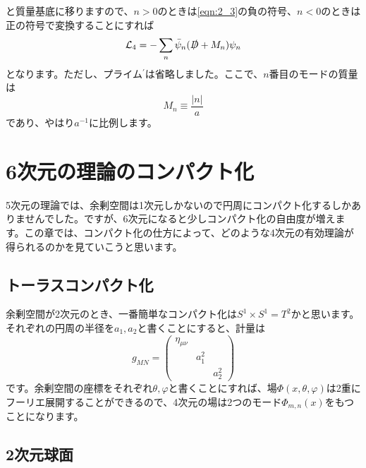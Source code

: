 \documentclass[unicode,a4paper,11pt]{ltjsarticle}
\begin{document}
と質量基底に移りますので、$n>0$のときは\eqref{eqn:2_3}の負の符号、$n<0$のときは正の符号で変換することにすれば
\begin{equation}
   \mathcal{L}_{4}
   =
   -
   \sum_{n}\bar{\psi}_{n}(\slashed{D}+M_{n})\psi_{n}
\end{equation}
となります。ただし、プライム$^{\prime}$は省略しました。ここで、$n$番目のモードの質量は
\begin{equation}
   M_{n}
   \equiv
   \frac{|n|}{a}
\end{equation}
であり、やはり$a^{-1}$に比例します。


\section{6次元の理論のコンパクト化}

5次元の理論では、余剰空間は1次元しかないので円周にコンパクト化するしかありませんでした。ですが、6次元になると少しコンパクト化の自由度が増えます。この章では、コンパクト化の仕方によって、どのような4次元の有効理論が得られるのかを見ていこうと思います。

\subsection{トーラスコンパクト化}

余剰空間が2次元のとき、一番簡単なコンパクト化は$S^{1}\times S^{1}=T^{2}$かと思います。それぞれの円周の半径を$a_{1},a_{2}$と書くことにすると、計量は
\begin{equation}
   g_{MN}
   =
   \begin{pmatrix}
      \eta_{\mu\nu} &         &         \\
                    & a_{1}^2 &         \\
                    &         & a_{2}^2
   \end{pmatrix}
\end{equation}
です。余剰空間の座標をそれぞれ$\theta,\varphi$と書くことにすれば、場$\Phi(x,\theta,\varphi)$は2重にフーリエ展開することができるので、4次元の場は2つのモード$\Phi_{m,n}(x)$をもつことになります。


\subsection{2次元球面}
\end{document}

